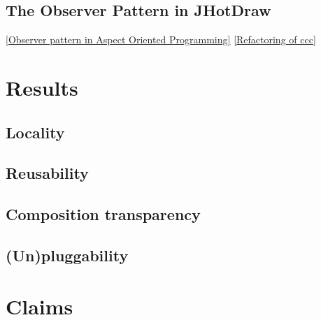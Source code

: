 \subsection{The Observer Pattern in JHotDraw}\label{The Observer Pattern in JHotDraw}

\ref{Observer pattern in Aspect Oriented Programming}
\ref{Refactoring of ccc}

\section{Results}\label{Results}

\subsection{Locality}
\subsection{Reusability}
\subsection{Composition transparency}
\subsection{(Un)pluggability}

\section{Claims}\label{Claims}